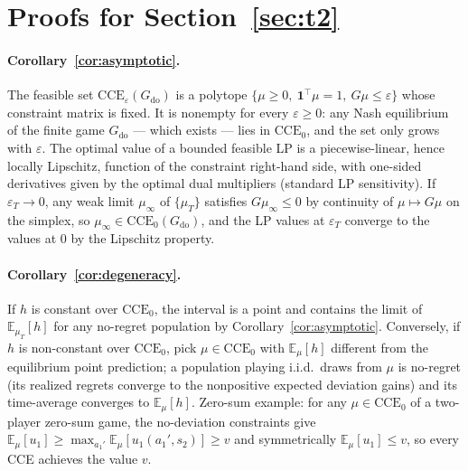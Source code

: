 \documentclass[pmlr]{jmlr}
\newcommand{\E}{\mathbb{E}}
\newcommand{\doop}{\mathrm{do}}
\newcommand{\CCE}{\mathrm{CCE}}
\begin{document}
\section{Proofs for Section~\ref{sec:t2}}\label{app:t2}

\paragraph{Corollary~\ref{cor:asymptotic}.} The feasible set $\CCE_\varepsilon(G_{\doop})$ is a
polytope $\{\mu \geq 0,\ \mathbf{1}^\top \mu = 1,\ G\mu \leq \varepsilon\}$ whose constraint
matrix is fixed. It is nonempty for every $\varepsilon \geq 0$: any Nash equilibrium of the
finite game $G_{\doop}$ --- which exists --- lies in $\CCE_0$, and the set only grows with
$\varepsilon$. The optimal value of a bounded feasible LP is a piecewise-linear, hence locally
Lipschitz, function of the constraint right-hand side, with one-sided derivatives given by the
optimal dual multipliers (standard LP sensitivity). If $\varepsilon_T \to 0$, any weak limit
$\mu_\infty$ of $\{\mu_T\}$ satisfies $G\mu_\infty \leq 0$ by continuity of
$\mu \mapsto G\mu$ on the simplex, so $\mu_\infty \in \CCE_0(G_{\doop})$, and the LP values at
$\varepsilon_T$ converge to the values at $0$ by the Lipschitz property. \hfill\BlackBox

\paragraph{Corollary~\ref{cor:degeneracy}.} If $h$ is constant over $\CCE_0$, the interval
is a point and contains the limit of $\E_{\mu_T}[h]$ for any no-regret population by
Corollary~\ref{cor:asymptotic}. Conversely, if $h$ is non-constant over $\CCE_0$, pick
$\mu \in \CCE_0$ with $\E_\mu[h]$ different from the equilibrium point prediction; a
population playing i.i.d.\ draws from $\mu$ is no-regret (its realized regrets converge to the
nonpositive expected deviation gains) and its time-average converges to $\E_\mu[h]$.
Zero-sum example: for any $\mu \in \CCE_0$ of a two-player zero-sum game, the no-deviation
constraints give $\E_\mu[u_1] \geq \max_{a_1'} \E_\mu[u_1(a_1', s_2)] \geq v$ and symmetrically
$\E_\mu[u_1] \leq v$, so every CCE achieves the value $v$. \hfill\BlackBox
\end{document}

